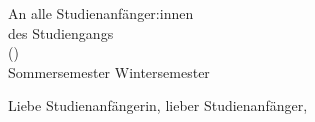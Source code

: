 \documentclass[paper=a4,media/anfibrief,fromlogo=on]{scrlttr2}
\begin{document}
  \date{\today}

  \begin{letter}
    {An alle Studienanfänger:innen\\
    des Studiengangs\\
    \studiengang (\abschluss)\\
    \ifsommersemester
    Sommersemester \YEAR
    \fi
    \ifwintersemester
    Wintersemester \YEAR
    \fi
    }

    \opening{Liebe Studienanfängerin, lieber Studienanfänger,}

    
    \pagebreak




     \\
    
    \pagebreak

    \enlargethispage{1ex}
    
    \pagebreak

     \\
    
    
    \iflehramt \pagebreak \fi
    \ifinfo \pagebreak \fi
    \ifmaster \pagebreak \fi
    \ifkogwiss \pagebreak \fi
    
    \pagebreak
    
    \vfill
    \pagebreak
    
  \end{letter}
\end{document}
